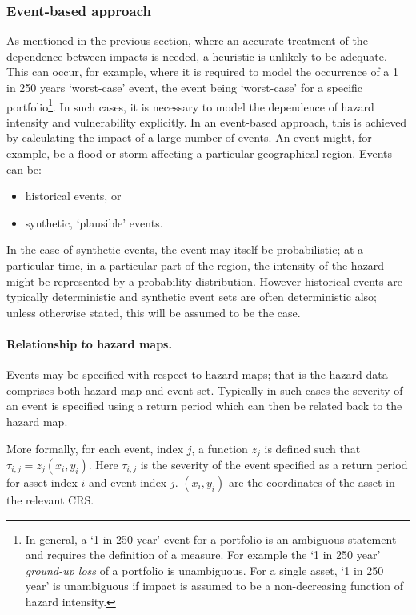 \documentclass[a4paper,11pt]{extarticle} %
\theoremstyle{definition}
\begin{document}
\subsubsection{Event-based approach}
As mentioned in the previous section, where an accurate treatment of the dependence between impacts is needed, a heuristic is unlikely to be adequate. This can occur, for example, where it is required to model the occurrence of a 1 in 250 years `worst-case' event, the event being `worst-case' for a specific portfolio\footnote{In general, a `1 in 250 year' event for a portfolio is an ambiguous statement and requires the definition of a measure. For example the `1 in 250 year' \emph{ground-up loss} of a portfolio is unambiguous. For a single asset, `1 in 250 year' is unambiguous if impact is assumed to be a non-decreasing function of hazard intensity.}. In such cases, it is necessary to model the dependence of hazard intensity and vulnerability explicitly. In an event-based approach, this is achieved by calculating the impact of a large number of events. An event might, for example, be a flood or storm affecting a particular geographical region. Events can be:

\begin{itemize}
    \item historical events, or
    \item synthetic, `plausible' events.
\end{itemize}

In the case of synthetic events, the event may itself be probabilistic; at a particular time, in a particular part of the region, the intensity of the hazard might be represented by a probability distribution. However historical events are typically deterministic and synthetic event sets are often deterministic also; unless otherwise stated, this will be assumed to be the case.

\paragraph{Relationship to hazard maps.}
Events may be specified with respect to hazard maps; that is the hazard data comprises both hazard map and event set. Typically in such cases the severity of an event is specified using a return period which can then be related back to the hazard map.

More formally, for each event, index $j$, a function $z_j$ is defined such that $\tau_{i, j} = z_j(x_i, y_i)$. Here $\tau_{i, j}$ is the severity of the event specified as a return period for asset index $i$ and event index $j$.  $(x_i, y_i)$ are the coordinates of the asset in the relevant CRS.
\end{document}
